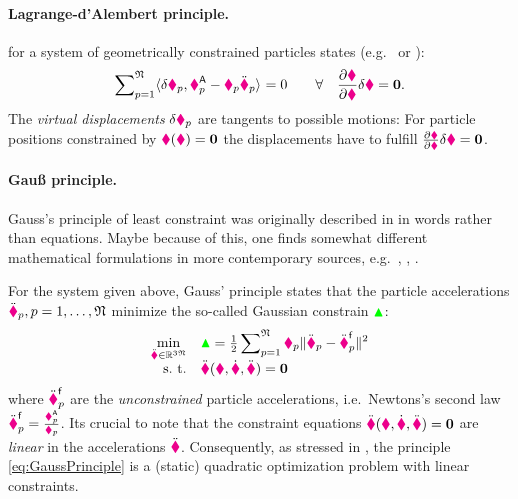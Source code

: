 \paragraph{Lagrange-d'Alembert principle.} 
for a system of geometrically constrained particles states (e.g.\ \cite[sec.\,1.4]{Goldstein:ClassicalMechanics} or \cite[sec.\,6.3]{Lurie:AnalyticalMechanics}):
\begin{align}\label{eq:DAlembertPrinciple}
 \sumParticlesFull \sProd{\delta \particlePos{\PidxI}}{\particleForceImpressed{\PidxI} - \particleMass{\PidxI}\particlePosdd{\PidxI}} = 0 
\qquad \forall \quad \pdiff[\particleGeoConstraint]{\particleCoord} \delta\particleCoord = \tuple{0}.
\end{align}
The \textit{virtual displacements} $\delta \particlePos{\PidxI}$ are tangents to possible motions:
For particle positions constrained by $\particleGeoConstraint(\particleCoord) = \tuple{0}$ the displacements have to fulfill $\pdiff[\particleGeoConstraint]{\particleCoord} \delta\particleCoord = \tuple{0}$.

\paragraph{Gauß principle.}
Gauss's principle of least constraint was originally described in \cite{Gauss:Principle} in words rather than equations.
Maybe because of this, one finds somewhat different mathematical formulations in more contemporary sources, e.g.\ \cite[sec.\ 7]{Paesler:PrinzipeDerMechanik}, \cite[sec.\,IV.8]{Lanczos:Variational}, \cite[sec.\,2.2]{Bremer:ElasticMultibodyDynamics}. %

For the system given above, Gauss' principle states that the particle accelerations $\particlePosdd{\PidxI}, \PidxI=1,\ldots,\numParticles$ minimize the so-called Gaussian constrain $\GaussianConstraint$:
\begin{align}\label{eq:GaussPrinciple}
 \begin{array}{rl}
  \minOp[\particleCoorddd\in\RealNum^{3\numParticles}] & \GaussianConstraint = \tfrac{1}{2} \displaystyle\sumParticlesFull \particleMass{\PidxI} \norm{\particlePosdd{\PidxI} - \particlePosdd{\PidxI}^{\idxText{f}}}^2 \\
  \text{s.\ t.} & \ddot{\particleGeoConstraint}(\particleCoord, \particleCoordd, \particleCoorddd) = \tuple{0}
 \end{array}
\end{align}
where $\particlePosdd{\PidxI}^{\idxText{f}}$ are the \textit{unconstrained} particle accelerations, i.e.\ Newtons's second law $\particlePosdd{\PidxI}^{\idxText{f}}=\tfrac{\particleForceImpressed{\PidxI}}{\particleMass{\PidxI}}$.
Its crucial to note that the constraint equations $\ddot{\particleGeoConstraint}(\particleCoord, \particleCoordd, \particleCoorddd) = \tuple{0}$ are \textit{linear} in the accelerations $\particleCoorddd$.
Consequently, as stressed in \cite{Gauss:Principle}, the principle \eqref{eq:GaussPrinciple} is a (static) quadratic optimization problem with linear constraints.


